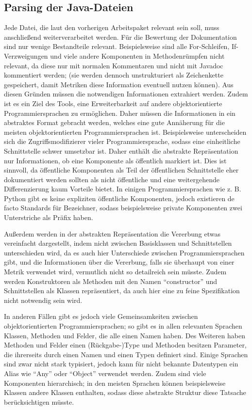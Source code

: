 \subsection{Parsing der Java-Dateien} 
Jede Datei, die laut den vorherigen Arbeitspaket relevant sein soll, muss anschließend weiterverarbeitet werden. Für die Bewertung der Dokumentation sind nur wenige Bestandteile relevant. Beispielsweise sind alle For-Schleifen, If-Verzweigungen und viele andere Komponenten in Methodenrümpfen nicht relevant, da diese nur mit normalen Kommentaren und nicht mit Javadoc kommentiert werden; (sie werden dennoch unstrukturiert als Zeichenkette gespeichert, damit Metriken diese Information eventuell nutzen können). Aus diesen Gründen müssen die notwendigen Informationen extrahiert werden. Zudem ist es ein Ziel des Tools, eine Erweiterbarkeit auf andere objektorientierte Programmiersprachen zu ermöglichen. Daher müssen die Informationen in ein abstraktes Format gebracht werden, welches eine gute Annäherung für die meisten objektorientierten Programmiersprachen ist. Beispielsweise unterscheiden sich die Zugriffsmodifizierer vieler Programmiersprache, sodass eine einheitliche Schnittstelle schwer umsetzbar ist. Daher enthält die abstrakte Repräsentation nur Informationen, ob eine Komponente als öffentlich markiert ist. Dies ist sinnvoll, da öffentliche Komponenten als Teil der öffentlichen Schnittstelle eher dokumentiert werden sollten als nicht öffentliche und eine weitergehende Differenzierung kaum Vorteile bietet. In einigen Programmiersprachen wie z. B. Python gibt es keine expliziten öffentliche Komponenten, jedoch existieren de facto Standards für Bezeichner, sodass beispielsweise private Komponenten zwei Unterstriche als Präfix haben.

Außerdem werden in der abstrakten Repräsentation die Vererbung etwas vereinfacht dargestellt, indem nicht zwischen Basisklassen und Schnittstellen unterschieden wird, da es auch hier Unterschiede zwischen Programmiersprachen gibt, und die Informationen über die Vererbung, falls sie überhaupt von einer Metrik verwendet wird, vermutlich nicht so detailreich sein müsste. Zudem werden Konstruktoren als Methoden mit den Namen \enquote{constructor} und Schnittstellen als Klassen repräsentiert, da auch hier eine zu feine Spezifikation nicht notwendig sein wird.  

  

In anderen Fällen gibt es jedoch viele Gemeinsamkeiten zwischen objektorientierten Programmiersprachen; so gibt es in  allen relevanten Sprachen Klassen, Methoden und Felder, die alle einen Namen haben. Des Weiteren haben Methoden und Felder einen (Rückgabe-)Type und Methoden besitzen Parameter, die ihrerseits durch einen Namen und einen Typen definiert sind. Einige Sprachen sind zwar nicht stark typisiert, jedoch kann für nicht bekannte Datentypen ein Alias wie \enquote{Any} oder  \enquote{Object} verwendet werden.  Zudem sind viele Komponenten hierarchisch; in den meisten Sprachen können beispielsweise Klassen andere Klassen enthalten, sodass diese abstrakte Struktur diese Tatsache berücksichtigen müsste. 

